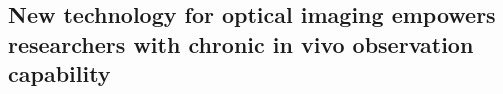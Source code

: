 \subsection{New technology for optical imaging  empowers researchers with chronic in vivo observation capability}